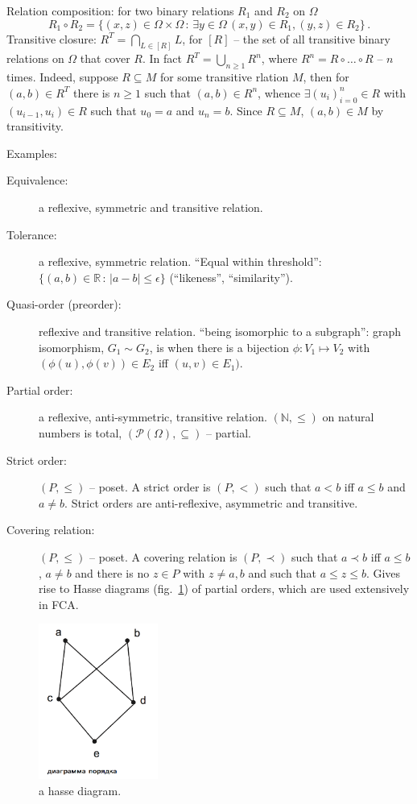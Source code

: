 \documentclass[a4paper]{article}
\begin{document}
\noindent Relation composition: for two binary relations $R_1$ and $R_2$ on $\Omega$
$$ R_1\circ R_2
    = \{(x,z)\in \Omega\times\Omega
        \,:\, \exists y\in \Omega\, (x,y)\in R_1, (y,z)\in R_2\}
    \,. $$
\noindent Transitive closure:
$R^T = \bigcap_{L\in [R]} L$, for $[R]$ -- the set of all transitive binary
relations on $\Omega$ that cover $R$. In fact $R^T = \bigcup_{n\geq1} R^n$,
where $R^n = R\circ \ldots \circ R$ -- $n$ times. Indeed, suppose $R\subseteq M$
for some transitive rlation $M$, then for $(a,b)\in R^T$ there is $n\geq 1$
such that $(a,b)\in R^n$, whence $\exists (u_i)_{i=0}^n\in R$ with $(u_{i-1}, u_i)\in R$
such that $u_0=a$ and $u_n=b$. Since $R\subseteq M$, $(a,b)\in M$ by transitivity.

\noindent Examples: \begin{description}
    \item[Equivalence:] a reflexive, symmetric and transitive relation.
    \item[Tolerance:] a reflexive, symmetric relation.
    ``Equal within threshold'': $\{(a,b)\in \mathbb{R}\,:\, |a-b|\leq \epsilon\}$
    (``likeness'', ``similarity'').
    \item[Quasi-order (preorder):] reflexive and transitive relation.
    ``being isomorphic to a subgraph'': graph isomorphism, $G_1 \sim G_2$, is when
    there is a bijection $\phi:V_1\mapsto V_2$ with $(\phi(u),\phi(v))\in E_2$ iff
    $(u,v)\in E_1)$.
    \item[Partial order:] a reflexive, anti-symmetric, transitive relation.
    $(\mathbb{N}, \leq)$ on natural numbers is total, $(\mathcal{P}(\Omega),
    \subseteq)$ -- partial.
    \item[Strict order:] $(P, \leq)$ -- poset. A strict order is $(P, <)$ such
    that $a<b$ iff $a\leq b$ and $a\neq b$. Strict orders are anti-reflexive,
    asymmetric and transitive.
    \item[Covering relation:] $(P, \leq)$ -- poset. A covering relation is $(P, \prec)$
    such that $a\prec b$ iff $a\leq b$, $a\neq b$ and there is no $z\in P$ with $z\neq a,b$
    and such that $a\leq z\leq b$. Gives rise to Hasse diagrams (fig.~\ref{fig:hasse})
    of partial orders, which are used extensively in FCA.
\end{description}
\begin{figure}
    \centering
    \includegraphics[width=0.35\textwidth]{hasse.png}
    \caption{a hasse diagram.}
    \label{fig:hasse}
\end{figure}
\end{document}
